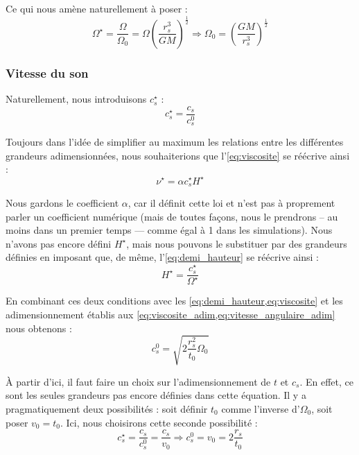 Ce qui nous amène naturellement à poser :
\begin{equation}
    \label{eq:vitesse_angulaire_adim}
    \Omega^\star = \frac{\Omega}{\Omega_0} = \Omega \left( \frac{r_s^3}{G M} \right)^\frac{1}{2} \Rightarrow \Omega_0 = \left( \frac{G M}{r_s^3} \right)^\frac{1}{2}
\end{equation}

\subsubsection{Vitesse du son}

Naturellement, nous introduisons $c_s^\star$ :
\begin{equation}
   c_s^\star = \frac{c_s}{c_s^0}
\end{equation}

Toujours dans l’idée de simplifier au maximum les relations entre les
différentes grandeurs adimensionnées, nous souhaiterions que
l’\cref{eq:viscosite} se réécrive ainsi :
\begin{equation}
    \nu^\star = \alpha c_s^\star H^\star
\end{equation}

Nous gardons le coefficient $\alpha$, car il définit cette loi et n’est pas à
proprement parler un coefficient numérique (mais de toutes façons, nous le
prendrons – au moins dans un premier temps — comme égal à 1 dans les
simulations). Nous n’avons pas encore défini $H^\star$, mais nous pouvons le
substituer par des grandeurs définies en imposant que, de même,
l’\cref{eq:demi_hauteur} se réécrive ainsi :
\begin{equation}
    \label{eq:rel_demi_hauteur_adim}
    H^\star = \frac{c_s^\star}{\Omega^\star}
\end{equation}

En combinant ces deux conditions avec les \cref{eq:demi_hauteur,eq:viscosite} et les adimensionnement
établis aux \cref{eq:viscosite_adim,eq:vitesse_angulaire_adim} nous obtenons :
\begin{equation}
    c_s^0 = \sqrt{2 \frac{r_s^2}{t_0} \Omega_0}
\end{equation}

À partir d’ici, il faut faire un choix sur l’adimensionnement de $t$ et $c_s$.
En effet, ce sont les seules grandeurs pas encore définies dans cette équation.
Il y a pragmatiquement deux possibilités : soit définir $t_0$ comme l’inverse
d’$\Omega_0$, soit poser $v_0 = t_0$. Ici, nous choisirons cette seconde
possibilité :
\begin{equation}
    \label{eq:vitesse_son_adim}
    c_s^\star = \frac{c_s}{c_s^0} = \frac{c_s}{v_0} \Rightarrow c_s^0 = v_0 = 2 \frac{r_s}{t_0}
\end{equation}

